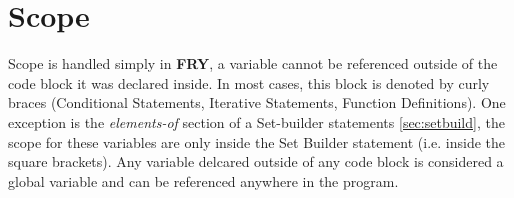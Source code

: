 \documentclass{article}
\begin{document}
\section{Scope}
Scope is handled simply in \textbf{FRY}, a variable cannot be referenced outside of the code block it was declared inside. In most cases, this block is denoted by curly braces (Conditional Statements, Iterative Statements, Function Definitions). One exception is the \emph{elements-of} section of a Set-builder statements \ref{sec:setbuild}, the scope for these variables are only inside the Set Builder statement (i.e. inside the square brackets). Any variable delcared outside of any code block is considered a global variable and can be referenced anywhere in the program.
\end{document}
